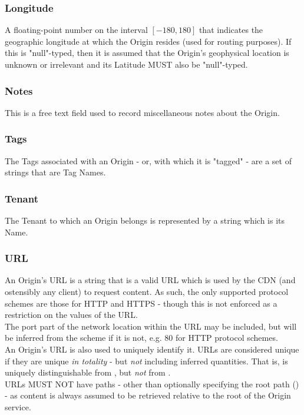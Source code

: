 \subsubsection{Longitude}
A floating-point number on the interval $[-180, 180]$ that indicates the
geographic longitude at which the Origin resides (used for routing purposes). If
this is "null"-typed, then it is assumed that the Origin's geophysical location
is unknown or irrelevant and its Latitude MUST also be "null"-typed.

\subsubsection{Notes}
This is a free text field used to record miscellaneous notes about the Origin.

\subsubsection{Tags}
The Tags associated with an Origin - or, with which it is "tagged" - are a set
of strings that are Tag Names.

\subsubsection{Tenant}
The Tenant to which an Origin belongs is represented by a string which is its
Name.

\subsubsection{URL}
An Origin's URL is a string that is a valid URL which is used by the CDN (and
ostensibly any client) to request content. As such, the only supported protocol
schemes are those for HTTP and HTTPS - though this is not enforced as a
restriction on the values of the URL.\\
The port part of the network location within the URL may be included, but will
be inferred from the scheme if it is not, e.g. 80 for HTTP protocol schemes.\\
An Origin's URL is also used to uniquely identify it. URLs are considered unique
if they are unique \emph{in totality} - but \emph{not} including inferred
quantities. That is,  is uniquely distinguishable from
, but \emph{not} from .\\
URLs MUST NOT have paths - other than optionally specifying the root path
(\code{/}) - as content is always assumed to be retrieved relative to the root
of the Origin service.
